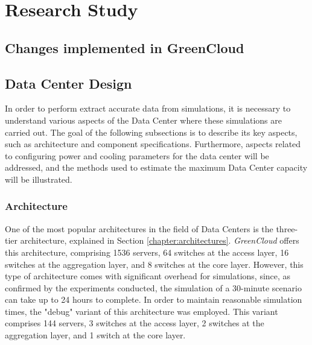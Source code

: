 \chapter{Research Study} \label{chapter:research_study}

\begin{citazione}

\end{citazione}
\newpage

\section{Changes implemented in GreenCloud}\label{section:greencloud_mod}

\section{Data Center Design}
In order to perform extract accurate data from simulations, it is necessary to understand various aspects of the Data Center where these simulations are carried out. The goal of the following subsections is to describe its key aspects, such as architecture and component specifications. Furthermore, aspects related to configuring power and cooling parameters for the data center will be addressed, and the methods used to estimate the maximum Data Center capacity will be illustrated.

\subsection{Architecture}
One of the most popular architectures in the field of Data Centers is the three-tier architecture, explained in Section \ref{chapter:architectures}. \emph{GreenCloud} offers this architecture, comprising 1536 servers, 64 switches at the access layer, 16 switches at the aggregation layer, and 8 switches at the core layer. However, this type of architecture comes with significant overhead for simulations, since, as confirmed by the experiments conducted, the simulation of a 30-minute scenario can take up to 24 hours to complete. In order to maintain reasonable simulation times, the "debug" variant of this architecture was employed. This variant comprises 144 servers, 3 switches at the access layer, 2 switches at the aggregation layer, and 1 switch at the core layer. 

